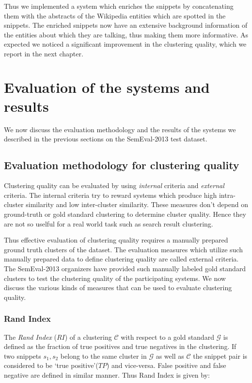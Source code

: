\documentclass[a4paper,12pt]{report}
\begin{document}
Thus we implemented a system which enriches the snippets by
concatenating them with the abstracts of the Wikipedia entities which
are spotted in the snippets. The enriched snippets now have an extensive
background information of the entities about which they are talking,
thus making them more informative. As expected we noticed a
significant improvement in the clustering quality, which we report in
the next chapter.



 


\chapter{Evaluation of the systems and results}
We now discuss the evaluation methodology and the results of the
systems we described in the previous sections on the SemEval-2013
test dataset. 

\section{Evaluation methodology for clustering quality}
Clustering quality can be evaluated by using {\it internal} criteria
and {\it external} criteria. The internal criteria try to reward
systems which produce high intra-cluster similarity and low
inter-cluster similarity. These measures don't depend on ground-truth
or gold standard clustering to determine cluster quality. Hence they
are not so uselful for a real world task such as search result
clustering.

Thus effective evaluation of clustering quality requires a manually
prepared ground truth clusters of the dataset. The evaluation measures
which utilize such manually prepared data to define clustering quality
are called external criteria. The SemEval-2013 organizers have provided
such manually labeled gold standard clusters to test the clustering
quality of the participating systems. We now discuss the various kinds
of measures that can be used to evaluate clustering quality.

\subsection{Rand Index}

The {\it Rand Index} ($RI$) of a clustering $\mathcal{C}$ with respect
to a gold standard $\mathcal{G}$ is defined as the fraction of true
positives and true negatives in the clustering. If two snippets $s_1,
s_2$ belong to the same cluster in $\mathcal{G}$ as well as
$\mathcal{C}$ the snippet pair is considered to be `true
positive'($TP$) and vice-versa. False positive and false negative are
defined in similar manner. Thus Rand Index is given by:
\end{document}
